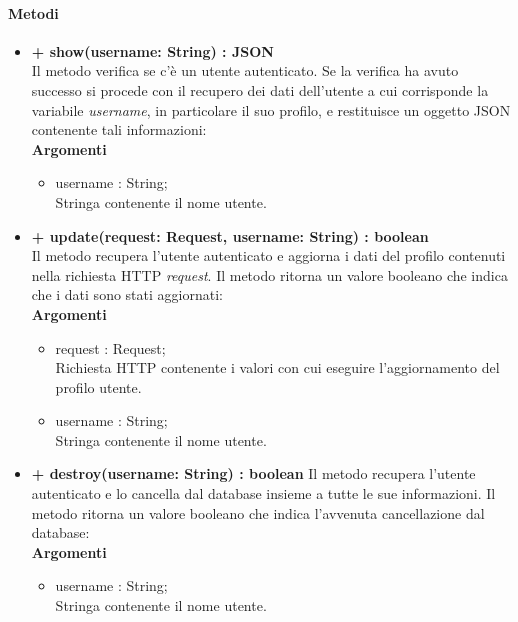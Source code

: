 	\paragraph{Metodi}
		\begin{itemize}
			\item \textbf{+ show(username: String) : JSON}\\
			Il metodo verifica se c'è un utente autenticato. Se la verifica ha avuto successo si procede con il recupero dei dati dell'utente a cui corrisponde la variabile \textit{username}, in particolare il suo profilo, e restituisce un oggetto \gls{JSON} contenente tali informazioni:\\
			\textbf{Argomenti}
			\begin{itemize}
				\item username : String;\\
				Stringa contenente il nome utente.
			\end{itemize}
			
			\newpage
			\item \textbf{+ update(request: Request, username: String) : boolean}\\
			Il metodo recupera l'utente autenticato e aggiorna i dati del profilo contenuti nella richiesta HTTP \textit{request}. Il metodo ritorna un valore booleano che indica che i dati sono stati aggiornati:\\
			\textbf{Argomenti}
			\begin{itemize}
				\item request : Request;\\
				Richiesta HTTP contenente i valori con cui eseguire l'aggiornamento del profilo utente.
				\item username : String;\\
				Stringa contenente il nome utente.
			\end{itemize}
			
			\item \textbf{+ destroy(username: String) : boolean}
			Il metodo recupera l'utente autenticato e lo cancella dal \gls{database} insieme a tutte le  sue informazioni. Il metodo ritorna un valore booleano che indica l'avvenuta cancellazione dal \gls{database}:\\
			\textbf{Argomenti}
			\begin{itemize}
				\item username : String;\\
				Stringa contenente il nome utente.
			\end{itemize}
		\end{itemize}
		
